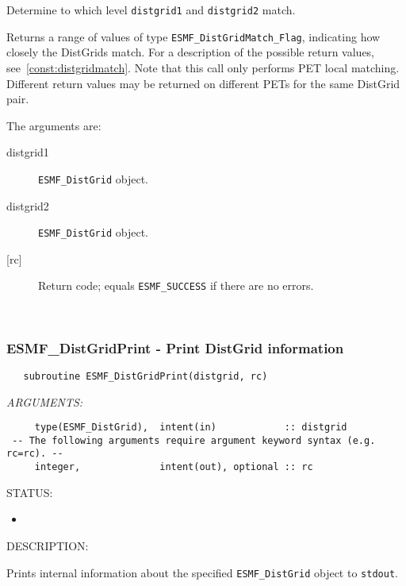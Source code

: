      Determine to which level {\tt distgrid1} and {\tt distgrid2} match. 
  
     Returns a range of values of type {\tt ESMF\_DistGridMatch\_Flag},
     indicating how closely the DistGrids match. For a description of the
     possible return values, see~\ref{const:distgridmatch}. 
     Note that this call only performs PET local matching. Different return values
     may be returned on different PETs for the same DistGrid pair.
  
     The arguments are:
     \begin{description}
     \item[distgrid1] 
       {\tt ESMF\_DistGrid} object.
     \item[distgrid2] 
       {\tt ESMF\_DistGrid} object.
     \item[{[rc]}] 
       Return code; equals {\tt ESMF\_SUCCESS} if there are no errors.
     \end{description}
   
 
\mbox{}\hrulefill\ 
 
\subsubsection [ESMF\_DistGridPrint] {ESMF\_DistGridPrint - Print DistGrid information}


 
\begin{verbatim}   subroutine ESMF_DistGridPrint(distgrid, rc)\end{verbatim}{\em ARGUMENTS:}
\begin{verbatim}     type(ESMF_DistGrid),  intent(in)            :: distgrid
 -- The following arguments require argument keyword syntax (e.g. rc=rc). --
     integer,              intent(out), optional :: rc  
           \end{verbatim}
{\sf STATUS:}
   \begin{itemize}
   \item{}
   \end{itemize}
  
{\sf DESCRIPTION:\\ }


       Prints internal information about the specified {\tt ESMF\_DistGrid} 
       object to {\tt stdout}. \\
  
